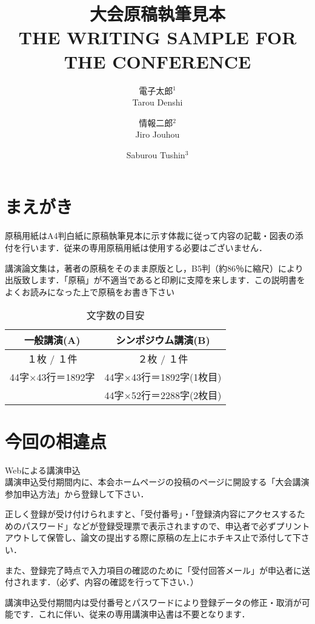 \documentclass[twocolumn, a4paper]{ieicejsp}
\title{{\bf 大会原稿執筆見本}
  {\normalsize \\ THE  WRITING  SAMPLE  FOR  THE  CONFERENCE}}
\author{
    電子太郎$^1$ \\ Tarou  Denshi \and
    情報二郎$^2$ \\ Jiro Jouhou \and
    Saburou Tushin$^3$
  }
\begin{document}
\maketitle
\section{まえがき}
原稿用紙はA4判白紙に原稿執筆見本に示す体裁に従って内容の記載・図表の添付を行います．従来の専用原稿用紙は使用する必要はございません．

講演論文集は，著者の原稿をそのまま原版とし，B5判（約86％に縮尺）により出版致します．「原稿」が不適当であると印刷に支障を来します．この説明書をよくお読みになった上で原稿をお書き下さい
\begin{table}[h]
\small
\caption{文字数の目安}
\begin{tabular}[t]{|c|c|}
\hline
  一般講演(A) & シンポジウム講演(B)\\
\hline
  １枚 / １件         & ２枚 / １件 \\
  44字×43行＝1892字 & 44字×43行＝1892字(1枚目) \\
                     & 44字×52行＝2288字(2枚目) \\
\hline
\end{tabular}
\end{table}

\section{今回の相違点}
\begin{newenumerate}
\item Webによる講演申込 \\
講演申込受付期間内に、本会ホームページの投稿のページに開設する「大会講演参加申込方法」から登録して下さい．

正しく登録が受け付けられますと、「受付番号」・「登録済内容にアクセスするためのパスワード」などが登録受理票で表示されますので、申込者で必ずプリントアウトして保管し、論文の提出する際に原稿の左上にホチキス止で添付して下さい．

また、登録完了時点で入力項目の確認のために「受付回答メール」が申込者に送付されます．（必ず、内容の確認を行って下さい．）

講演申込受付期間内は受付番号とパスワードにより登録データの修正・取消が可能です．これに伴い、従来の専用講演申込書は不要となります．
\end{newenumerate}
\end{document}
